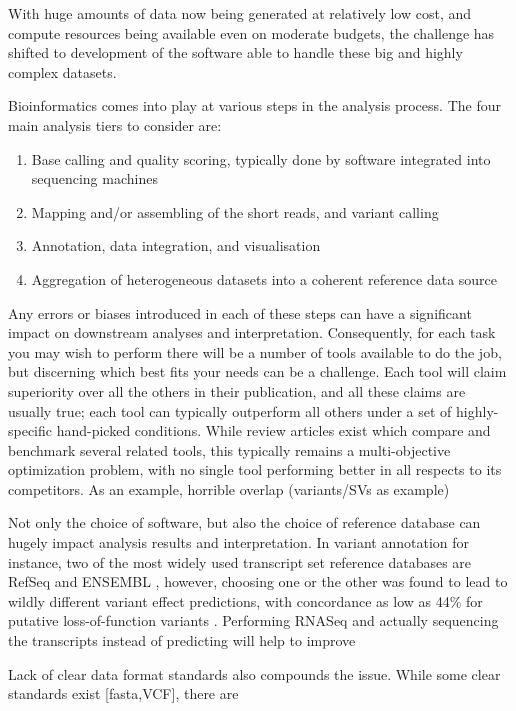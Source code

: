 With huge amounts of data now being generated at relatively low cost, and compute resources being available even on moderate budgets, the challenge has shifted to development of the software able to handle these big and highly complex datasets.

Bioinformatics comes into play at various steps in the analysis process. The four main analysis tiers \cite{kulski2016next} to consider are:
\begin{enumerate}
    \itemsep-0.5em
    \item Base calling and quality scoring, typically done by software integrated into sequencing machines
    \item Mapping and/or assembling of the short reads, and variant calling
    \item Annotation, data integration, and visualisation
    \item Aggregation of heterogeneous datasets into a coherent reference data source
\end{enumerate}

Any errors or biases introduced in each of these steps can have a significant impact on downstream analyses and interpretation. Consequently, for each task you may wish to perform there will be a number of tools available to do the job, but discerning which best fits your needs can be a challenge. Each tool will claim superiority over all the others in their publication, and all these claims are usually true; each tool can typically outperform all others under a set of highly-specific hand-picked conditions. While review articles exist which compare and benchmark several related tools, this typically remains a multi-objective optimization problem, with no single tool performing better in all respects to its competitors. As an example, horrible overlap (variants/SVs as example)

Not only the choice of software, but also the choice of reference database can hugely impact analysis results and interpretation. In variant annotation for instance, two of the most widely used transcript set reference databases are RefSeq \cite{} and ENSEMBL \cite{}, however, choosing one or the other was found to lead to wildly different variant effect predictions, with concordance as low as 44\% for putative loss-of-function variants \cite{mccarthy2014choice}. Performing RNASeq and actually sequencing the transcripts instead of predicting will help to improve

Lack of clear data format standards also compounds the issue. While some clear standards exist [fasta,VCF], there are


